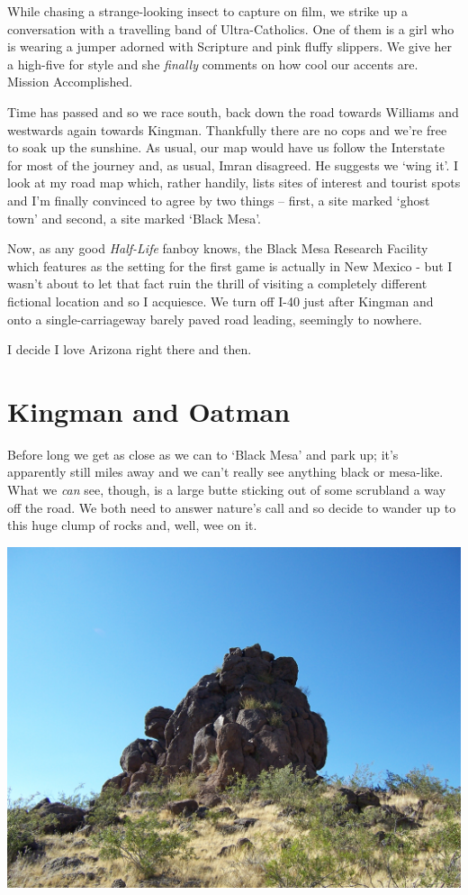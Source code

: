 \documentclass[a5paper,titlepage,11pt]{book}
\begin{document}
While chasing a strange-looking insect to capture on film, we strike up a conversation with a travelling band of Ultra-Catholics.  One of them is a girl who is wearing a jumper adorned with Scripture and pink fluffy slippers.  We give her a high-five for style and she \emph{finally} comments on how cool our accents are.  Mission Accomplished.

Time has passed and so we race south, back down the road towards Williams and westwards again towards Kingman.  Thankfully there are no cops and we're free to soak up the sunshine.  As usual, our map would have us follow the Interstate for most of the journey and, as usual, Imran disagreed.  He suggests we `wing it'.  I look at my road map which, rather handily, lists sites of interest and tourist spots and I'm finally convinced to agree by two things -- first, a site marked `ghost town' and second, a site marked `Black Mesa'.

Now, as any good \emph{Half-Life} fanboy knows, the Black Mesa Research Facility which features as the setting for the first game is actually in New Mexico - but I wasn't about to let that fact ruin the thrill of visiting a completely different fictional location and so I acquiesce.  We turn off I-40 just after Kingman and onto a single-carriageway barely paved road leading, seemingly to nowhere.

I decide I love Arizona right there and then.

\section*{Kingman and Oatman}

Before long we get as close as we can to `Black Mesa' and park up; it's apparently still miles away and we can't really see anything black or mesa-like.  What we \emph{can} see, though, is a large butte sticking out of some scrubland a way off the road.  We both need to answer nature's call and so decide to wander up to this huge clump of rocks and, well, wee on it.

\begin{center}\includegraphics[width=\textwidth]{gfx/100_1521}\end{center}
\end{document}
